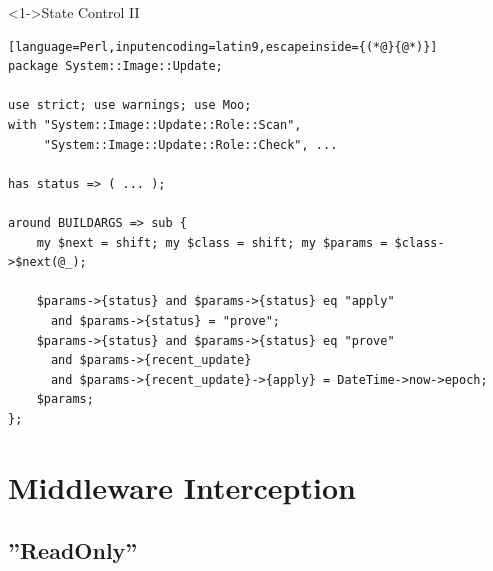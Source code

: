 \documentclass[ngerman,xcolor={table,dvipsnames},smaller,compress,hyperref={bookmarks,colorlinks}]{beamer}%
\begin{document}
\begin{frame}[t,fragile]

\begin{block}<1->{State Control II}
\scriptsize
\begin{lstlisting}[language=Perl,inputencoding=latin9,escapeinside={(*@}{@*)}]
package System::Image::Update;

use strict; use warnings; use Moo;
with "System::Image::Update::Role::Scan",
     "System::Image::Update::Role::Check", ...

has status => ( ... );

around BUILDARGS => sub {
    my $next = shift; my $class = shift; my $params = $class->$next(@_);

    $params->{status} and $params->{status} eq "apply"
      and $params->{status} = "prove";
    $params->{status} and $params->{status} eq "prove"
      and $params->{recent_update}
      and $params->{recent_update}->{apply} = DateTime->now->epoch;
    $params;
};
\end{lstlisting}
\end{block}

\begin{itemize}
\end{itemize}

\end{frame}

\section{Middleware Interception}

\subsection{''ReadOnly''}
\end{document}
